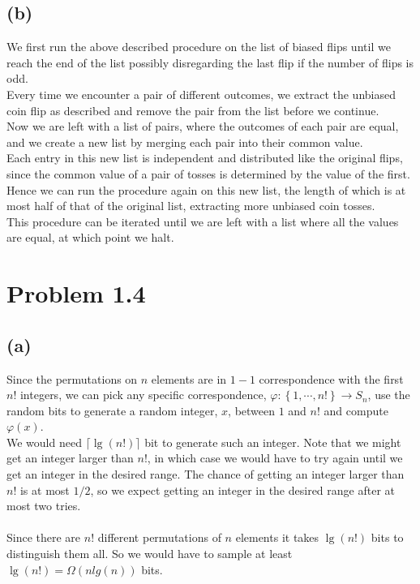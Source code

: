 \subsection*{(b)}
We first run the above described procedure on the list of biased flips until we reach the end of the list
possibly disregarding the last flip if the number of flips is odd. \\
Every time we encounter a pair of different outcomes, we extract the unbiased coin flip as described and remove the pair from the list
before we continue. \\
Now we are left with a list of pairs, where the outcomes of each pair are equal,
and we create a new list by merging each pair into their common value. \\
Each entry in this new list is independent and distributed like the original flips,
since the common value of a pair of tosses is determined by the value of the first. 
Hence we can run the procedure again on this new list, the length of which is at most half of that of the original list, 
extracting more unbiased coin tosses. \\
This procedure can be iterated until we are left with a list where all the values are equal,
at which point we halt.
\section*{Problem 1.4}
\subsection*{(a)}
Since the permutations on $n$ elements are in $1-1$ correspondence with the first $n!$ integers,
we can pick any specific correspondence, $\varphi:\left\{1,\cdots,n!\right\} \to S_n$, 
use the random bits to generate a random integer, $x$, between $1$ and $n!$
and compute $\varphi(x)$. \\
We would need $\lceil{\lg(n!)}\rceil$ bit to generate such an integer.
Note that we might get an integer larger than $n!$,
in which case we would have to try again until we get an integer in the desired range.
The chance of getting an integer larger than $n!$ is at most $1/2$, 
so we expect getting an integer in the desired range after at most two tries. \\ \\
Since there are $n!$ different permutations of $n$ elements it takes $\lg(n!)$ bits to distinguish them all.
So we would have to sample at least $\lg(n!)=\Omega(n lg(n))$ bits.
